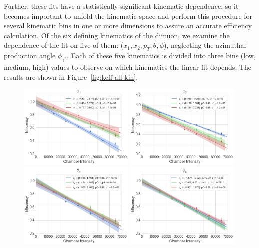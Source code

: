 Further, these fits have a statistically significant kinematic dependence, so it becomes important to unfold the kinematic space and perform this procedure for several kinematic bins in one or more dimensions to assure an accurate efficiency calculation. Of the six defining kinematics of the dimuon, we examine the dependence of the fit on five of them: ($x_1, x_2, p_T, \theta, \phi$), neglecting the azimuthal production angle $\phi_{\gamma^*}$. Each of these five kinematics is divided into three bins (low, medium, high) values to observe on which kinematics the linear fit depends. The results are shown in Figure~\ref{fig:keff-all-kin}.
\begin{figure}
\centering
\includegraphics[width=0.49\textwidth]{figures/analysis/x1-keff-int.png}
\includegraphics[width=0.49\textwidth]{figures/analysis/x2-keff-int.png} \\ \vspace{20px}
\includegraphics[width=0.49\textwidth]{figures/analysis/theta-keff-int.png}
\includegraphics[width=0.49\textwidth]{figures/analysis/phi-keff-int.png} \\ \vspace{20px}

\end{figure}

